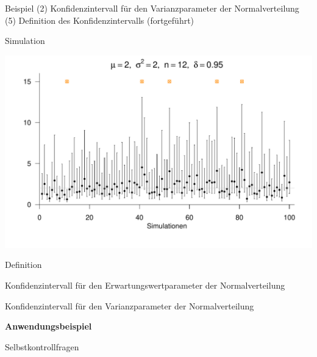 \documentclass[
  8pt,
  ignorenonframetext,
]{beamer}
\begin{document}
\begin{frame}{\small Beispiel (2) Konfidenzintervall für den
Varianzparameter der Normalverteilung}
\protect\hypertarget{beispiel-2-konfidenzintervall-fuxfcr-den-varianzparameter-der-normalverteilung-1}{}
\noindent(5) Definition des Konfidenzintervalls (fortgeführt)

\small

Simulation

\vspace{3mm}

\begin{center}\includegraphics[width=0.9\linewidth]{11_Abbildungen/wtfi_11_ki_sigsqr} \end{center}
\end{frame}

\begin{frame}{}
\protect\hypertarget{section-9}{}
\large

Definition

Konfidenzintervall für den Erwartungswertparameter der Normalverteilung

Konfidenzintervall für den Varianzparameter der Normalverteilung

\textbf{Anwendungsbeispiel}

Selbstkontrollfragen
\end{frame}
\end{document}
